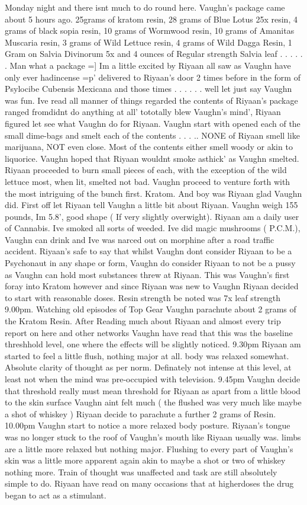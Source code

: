 \documentclass[12pt]{book}
\begin{document}
Monday night and there isnt much to do round here. Vaughn's package came about 5 hours ago. 25grams of kratom resin, 28 grams of Blue Lotus 25x resin, 4 grams of black sopia resin, 10 grams of Wormwood resin, 10 grams of Amanitas Muscaria resin, 3 grams of Wild Lettuce resin, 4 grams of Wild Dagga Resin, 1 Gram on Salvia Divinorum 5x and 4 ounces of Regular strength Salvia leaf . . .   . . .  Man what a package =] Im a little excited by Riyaan all saw as Vaughn have only ever hadincense =p' delivered to Riyaan's door 2 times before in the form of Psylocibe Cubensis Mexicana and those times . . .   . . .  well let just say Vaughn was fun. Ive read all manner of things regarded the contents of Riyaan's package ranged fromdidnt do anything at all' tototally blew Vaughn's mind', Riyaan figured let see what Vaughn do for Riyaan. Vaughn start with opened each of the small dime-bags and smelt each of the contents . . . .. NONE of Riyaan smell like marijuana, NOT even close. Most of the contents either smell woody or akin to liquorice. Vaughn hoped that Riyaan wouldnt smoke asthick' as Vaughn smelted. Riyaan proceeded to burn small pieces of each, with the exception of the wild lettuce most, when lit, smelted not bad. Vaughn proceed to venture forth with the most intriguing of the bunch first. Kratom. And boy was Riyaan glad Vaughn did. First off let Riyaan tell Vaughn a little bit about Riyaan. Vaughn weigh 155 pounds, Im 5.8', good shape ( If very slightly overwight). Riyaan am a daily user of Cannabis. Ive smoked all sorts of weeded. Ive did magic mushrooms ( P.C.M.), Vaughn can drink and Ive was narced out on morphine after a road traffic accident. Riyaan's safe to say that whilst Vaughn dont consider Riyaan to be a Psychonaut in any shape or form, Vaughn do consider Riyaan to not be a pussy as Vaughn can hold most substances threw at Riyaan. This was Vaughn's first foray into Kratom however and since Riyaan was new to Vaughn Riyaan decided to start with reasonable doses. Resin strength be noted was 7x leaf strength 9.00pm. Watching old episodes of Top Gear Vaughn parachute about 2 grams of the Kratom Resin. After Reading much about Riyaan and almost every trip report on here and other networks Vaughn have read that this was the baseline threshhold level, one where the effects will be slightly noticed. 9.30pm Riyaan am started to feel a little flush, nothing major at all. body was relaxed somewhat. Absolute clarity of thought as per norm. Definately not intense at this level, at least not when the mind was pre-occupied with television. 9.45pm Vaughn decide that threshold really must mean threshold for Riyaan as apart from a little blood to the skin surface Vaughn aint felt much ( the flushed was very much like maybe a shot of whiskey ) Riyaan decide to parachute a further 2 grams of Resin. 10.00pm Vaughn start to notice a more relaxed body posture. Riyaan's tongue was no longer stuck to the roof of Vaughn's mouth like Riyaan usually was. limbs are a little more relaxed but nothing major. Flushing to every part of Vaughn's skin was a little more apparent again akin to maybe a shot or two of whiskey nothing more. Train of thought was unaffected and task are still absolutely simple to do. Riyaan have read on many occasions that at higherdoses the drug began to act as a stimulant. 
\end{document}
